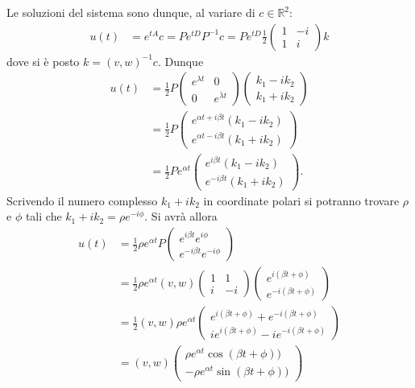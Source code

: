 \documentclass[italian,a4paper]{scrartcl}
\newcommand{\RR}{{\mathbb R}}
\begin{document}
Le soluzioni del sistema sono dunque, al variare di $c\in \RR^2$:
\begin{align*}
u(t) & = e^{tA} c = P e^{tD}P^{-1} c
       = P e^{tD} \frac 1 2 \begin{pmatrix}1 & -i\\ 1 & i\end{pmatrix} k
\end{align*}
dove si è posto $k=(v,w)^{-1} c$. Dunque
\begin{align*}
  u(t) &= \frac 1 2 P \begin{pmatrix}e^{\lambda t} & 0 \\ 0 & e^{\bar \lambda t}\end{pmatrix}
          \begin{pmatrix}k_1 - ik_2\\ k_1 + i k_2\end{pmatrix}\\
 &= \frac 1 2 P \begin{pmatrix}e^{\alpha t + i \beta t}(k_1-ik_2) \\ e^{\alpha t - i \beta t}(k_1 + i k_2)\end{pmatrix} \\
 &= \frac 1 2 P e^{\alpha t}\begin{pmatrix} e^{i\beta t}(k_1-ik_2) \\
  e^{-i\beta t}(k_1 + ik_2)\end{pmatrix}.
\end{align*}
Scrivendo il numero complesso $k_1 + i k_2$ in coordinate polari si potranno trovare $\rho$ e $\phi$ tali
che $k_1 + i k_2 = \rho e^{-i\phi}$. Si avrà allora
\begin{align*}
u(t) 
&= 
\frac 1 2 \rho e^{\alpha t}P\begin{pmatrix}
e^{i\beta t} e^{i\phi} \\
e^{-i\beta t} e^{-i\phi}
\end{pmatrix}\\
&= 
\frac 1 2 \rho e^{\alpha t} (v,w)
\begin{pmatrix}1 & 1 \\ i & -i\end{pmatrix} 
\begin{pmatrix}
e^{i(\beta t+\phi)} \\
e^{-i(\beta t+\phi)}
\end{pmatrix}\\
& =
\frac 1 2 (v,w) \rho e^{\alpha t} 
\begin{pmatrix}
e^{i(\beta t+\phi)} + e^{-i(\beta t+\phi)}\\
ie^{i(\beta t+\phi)} - ie^{-i(\beta t+\phi)}
\end{pmatrix}\\
&=
(v,w)
\begin{pmatrix}
\rho e^{\alpha t}
\cos(\beta t+\phi))\\
-\rho e^{\alpha t}
\sin(\beta t+\phi))
\end{pmatrix}
\end{align*}
\end{document}
